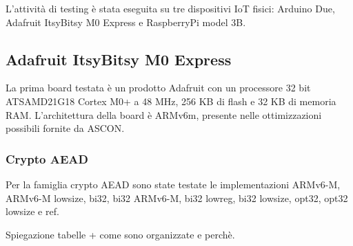 \documentclass{report}
\begin{document}
L'attività di testing è stata eseguita su tre dispositivi IoT fisici: Arduino Due, Adafruit ItsyBitsy M0 Express e RaspberryPi model 3B.

\subsection{Adafruit ItsyBitsy M0 Express}

La prima board testata è un prodotto Adafruit con un processore 32 bit ATSAMD21G18 Cortex M0+ a 48 MHz, 256 KB di flash e 32 KB di memoria RAM.\cite{adafruit} L'architettura della board è ARMv6m, presente nelle ottimizzazioni possibili fornite da ASCON.\cite{arm}

\subsubsection{Crypto AEAD}

Per la famiglia crypto AEAD sono state testate le implementazioni ARMv6-M, ARMv6-M lowsize, bi32, bi32 ARMv6-M, bi32 lowreg, bi32 lowsize, opt32, opt32 lowsize e ref.

Spiegazione tabelle + come sono organizzate e perchè.
\end{document}
